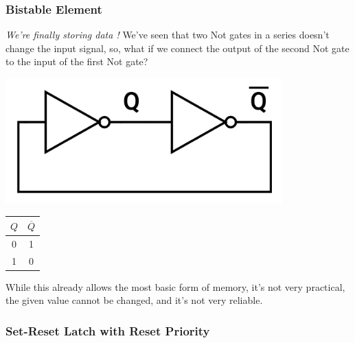 \documentclass[12pt,openany]{book}
\begin{document}
\subsubsection{Bistable Element}
\textit{We're finally storing data !} \newline
We've seen that two Not gates in a series doesn't change the input signal, so, what if we connect the output of the second Not gate to the input of the first Not gate? \newline


\vspace*{20px} 
\noindent
\begin{minipage}{0.40\textwidth}
	\begin{center}
		\includegraphics[width=0.80\textwidth]{circuits/12.1.3.png}
	\end{center}
\end{minipage}
\hfill
\vline
\hfill
\begin{minipage}{0.50\textwidth}
	\begin{center}
		\large
		\begin{tabular}{|c|c|}
			\hline
			
			$Q$ & $\overline{Q}$ \\
			\hline
			0 & 1 \\
			1 & 0 \\
			\hline
		\end{tabular}
	\end{center}
\end{minipage}
\newline
\vspace*{15px}
While this already allows the most basic form of memory, it's not very practical, the given value cannot be changed, and it's not very reliable.
\subsubsection{Set-Reset Latch with Reset Priority}
\end{document}
